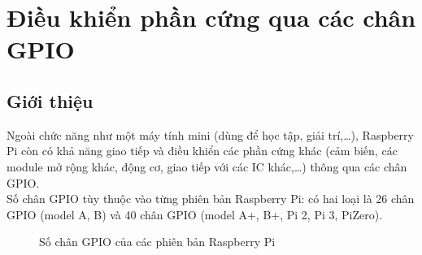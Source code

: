 \chapter{Điều khiển phần cứng qua các chân GPIO}
\section{Giới thiệu}
Ngoài chức năng như một máy tính mini (dùng để học tập, giải trí,\ldots), Raspberry Pi còn có khả năng giao tiếp và điều khiển các phần cứng khác (cảm biến, các module mở rộng khác, động cơ, giao tiếp với các IC khác,\ldots) thông qua các chân GPIO.\\

Số chân GPIO tùy thuộc vào từng phiên bản Raspberry Pi: có hai loại là 26 chân GPIO (model A, B) và 40 chân GPIO (model A+, B+, Pi 2, Pi 3, PiZero).
\begin{figure}[!h]
	\hspace{2cm}
\caption{Số chân GPIO của các phiên bản Raspberry Pi}\label{Fig:gpio}
\end{figure}
